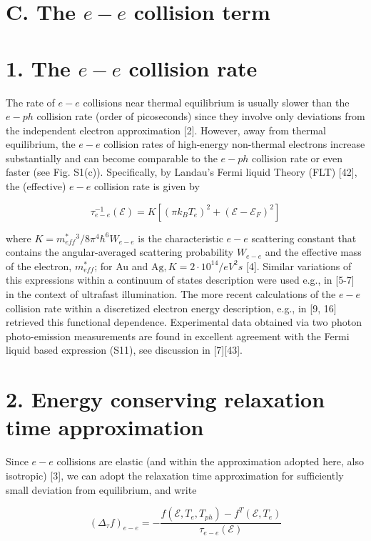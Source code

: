 \documentclass[10pt]{article}
\begin{document}
\section*{C. The $e-e$ collision term}
\section*{1. The $e-e$ collision rate}
The rate of $e-e$ collisions near thermal equilibrium is usually slower than the $e-p h$ collision rate (order of picoseconds) since they involve only deviations from the independent electron approximation [2]. However, away from thermal equilibrium, the $e-e$ collision rates of high-energy non-thermal electrons increase substantially and can become comparable to the $e-p h$ collision rate or even faster (see Fig. S1(c)). Specifically, by Landau's Fermi liquid Theory (FLT) [42], the (effective) $e-e$ collision rate is given by


\begin{equation*}
\tau_{e-e}^{-1}(\mathcal{E})=K\left[\left(\pi k_{B} T_{e}\right)^{2}+\left(\mathcal{E}-\mathcal{E}_{F}\right)^{2}\right] \tag{S11}
\end{equation*}


where $K=m_{e f f}^{*}{ }^{3} / 8 \pi^{4} \hbar^{6} W_{e-e}$ is the characteristic $e-e$ scattering constant that contains the angular-averaged scattering probability $W_{e-e}$ and the effective mass of the electron, $m_{e f f}^{*}$; for Au and $\mathrm{Ag}, K=2 \cdot 10^{14} / e V^{2} s$ [4]. Similar variations of this expressions within a continuum of states description were used e.g., in [5-7] in the context of ultrafast illumination. The more recent calculations of the $e-e$ collision rate within a discretized electron energy description, e.g., in [9, 16] retrieved this functional dependence. Experimental data obtained via two photon photo-emission measurements are found in excellent agreement with the Fermi liquid based expression (S11), see discussion in [7][43].

\section*{2. Energy conserving relaxation time approximation}
Since $e-e$ collisions are elastic (and within the approximation adopted here, also isotropic) [3], we can adopt the relaxation time approximation for sufficiently small deviation from equilibrium, and write


\begin{equation*}
\left(\Delta_{\tau} f\right)_{e-e}=-\frac{f\left(\mathcal{E}, T_{e}, T_{p h}\right)-f^{T}\left(\mathcal{E}, T_{e}\right)}{\tau_{e-e}(\mathcal{E})} \tag{S12}
\end{equation*}
\end{document}
